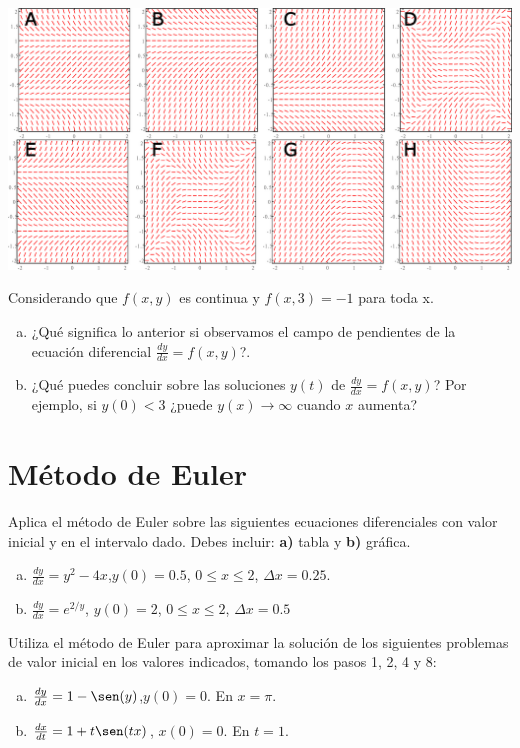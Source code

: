 \documentclass[12pt]{exam}
\begin{document}
\begin{questions}
     \includegraphics[scale=.48]{F1T1.pdf}


     \question
     Considerando que $f(x,y)$ es continua y $f(x,3)=-1$ para toda x.
     \begin{enumerate}[a)]
         \item ¿Qué significa lo anterior si observamos el campo de pendientes de la ecuación diferencial $\frac{dy}{dx}=f(x,y)$?.
         \item ¿Qué puedes concluir sobre las soluciones $y(t)$ de $\frac{dy}{dx}=f(x,y)$? Por ejemplo, si $y(0)<3$ ¿puede $y(x)\rightarrow\infty$ cuando $x$ aumenta?
     \end{enumerate}

    \section{Método de Euler}

     \question
     Aplica el método de Euler sobre las siguientes ecuaciones diferenciales con valor inicial y en el intervalo dado. Debes incluir: \textbf{a)} tabla y \textbf{b)} gráfica.
     
     \begin{enumerate}[a)]
         \item $\frac{dy}{dx}=y^2-4x$,\quad $y(0)=0.5$, \quad$0\leq x\leq2$, \quad$ \Delta x=0.25$.
         \item $\frac{dy}{dx}=e^{2/y}$, \quad$y(0)=2$, \quad$0\leq x\leq2$, \quad$\Delta x=0.5$
     \end{enumerate}

     \question
     Utiliza el método de Euler para aproximar la solución de los siguientes problemas de valor inicial en los valores indicados, tomando los pasos 1, 2, 4 y 8:
     
     \begin{enumerate}[a)]
         \item $\frac{dy}{dx}=1-\sen(y)$,\quad $y(0)=0$. En $x=\pi$.
         \item $\frac{dx}{dt}=1+t\sen(tx)$, \quad$x(0)=0$. En $t=1$.
     \end{enumerate}


\end{questions}
\end{document}
